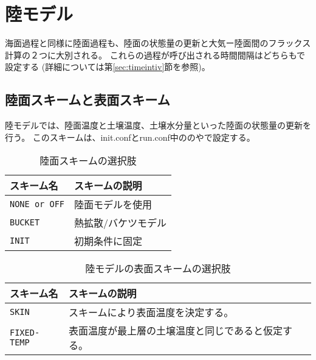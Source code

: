 \section{陸モデル} \label{sec:basic_usel_land}
海面過程と同様に陸面過程も、陸面の状態量の更新と大気ー陸面間のフラックス計算の２つに大別される。
これらの過程が呼び出される時間間隔はどちらもで設定する
(詳細については第\ref{sec:timeintiv}節を参照)。\\


\subsection{陸面スキームと表面スキーム}
陸モデルでは、陸面温度と土壌温度、土壌水分量といった陸面の状態量の更新を行う。
このスキームは、init.confとrun.conf中ののやで設定する。


\begin{table}[hbt]
\begin{center}
  \caption{陸面スキームの選択肢}
  \label{tab:nml_land_dyn}
  \begin{tabularx}{150mm}{lX} \hline
    \rowcolor[gray]{0.9}  スキーム名 & スキームの説明 \\ \hline
      \verb|NONE or OFF| & 陸面モデルを使用 \\
      \verb|BUCKET|      & 熱拡散/バケツモデル \\
      \verb|INIT|        & 初期条件に固定 \\
    \hline
  \end{tabularx}
\end{center}
\end{table}

\begin{table}[hbt]
\begin{center}
  \caption{陸モデルの表面スキームの選択肢}
  \label{tab:nml_land_sfc}
  \begin{tabularx}{150mm}{lX} \hline
    \rowcolor[gray]{0.9}  スキーム名 & スキームの説明 \\ \hline
      \verb|SKIN|       & スキームにより表面温度を決定する。 \\
      \verb|FIXED-TEMP| & 表面温度が最上層の土壌温度と同じであると仮定する。 \\
    \hline
  \end{tabularx}
\end{center}
\end{table}

